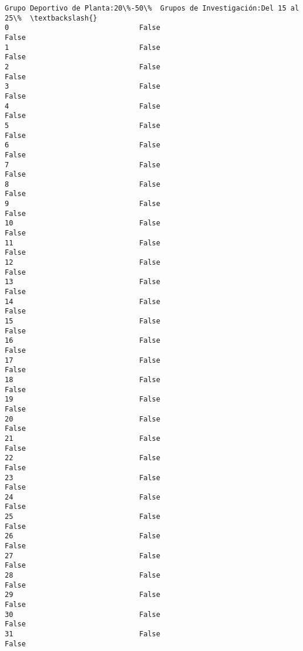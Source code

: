 \documentclass[11pt]{article}
\begin{document}
\begin{Verbatim}[commandchars=\\\{\}]
    Grupo Deportivo de Planta:20\%-50\%  Grupos de Investigación:Del 15 al 25\%  \textbackslash{}
0                               False                                  False   
1                               False                                  False   
2                               False                                  False   
3                               False                                  False   
4                               False                                  False   
5                               False                                  False   
6                               False                                  False   
7                               False                                  False   
8                               False                                  False   
9                               False                                  False   
10                              False                                  False   
11                              False                                  False   
12                              False                                  False   
13                              False                                  False   
14                              False                                  False   
15                              False                                  False   
16                              False                                  False   
17                              False                                  False   
18                              False                                  False   
19                              False                                  False   
20                              False                                  False   
21                              False                                  False   
22                              False                                  False   
23                              False                                  False   
24                              False                                  False   
25                              False                                  False   
26                              False                                  False   
27                              False                                  False   
28                              False                                  False   
29                              False                                  False   
30                              False                                  False   
31                              False                                  False   

\end{Verbatim}
\end{document}
